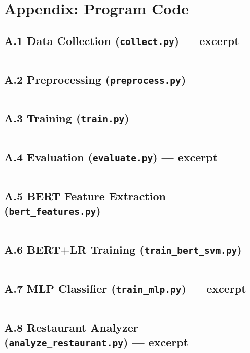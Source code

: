 \documentclass[12pt]{article}
\begin{document}



\clearpage
\appendix
\section*{Appendix: Program Code}

\subsection*{A.1 Data Collection (\texttt{collect.py}) --- excerpt}
\inputminted[firstline=1,lastline=60]{python}{code/collect.py}

\subsection*{A.2 Preprocessing (\texttt{preprocess.py})}
\inputminted{python}{code/preprocess.py}

\subsection*{A.3 Training (\texttt{train.py})}
\inputminted{python}{code/train.py}

\subsection*{A.4 Evaluation (\texttt{evaluate.py}) --- excerpt}
\inputminted[firstline=1,lastline=80]{python}{code/evaluate.py}

\subsection*{A.5 BERT Feature Extraction (\texttt{bert\_features.py})}
\inputminted{python}{code/bert_features.py}

\subsection*{A.6 BERT+LR Training (\texttt{train\_bert\_svm.py})}
\inputminted{python}{code/train_bert_svm.py}

\subsection*{A.7 MLP Classifier (\texttt{train\_mlp.py}) --- excerpt}
\inputminted[firstline=1,lastline=100]{python}{code/train_mlp.py}

\subsection*{A.8 Restaurant Analyzer (\texttt{analyze\_restaurant.py}) --- excerpt}
\inputminted[firstline=1,lastline=100]{python}{code/analyze_restaurant.py}
\end{document}
